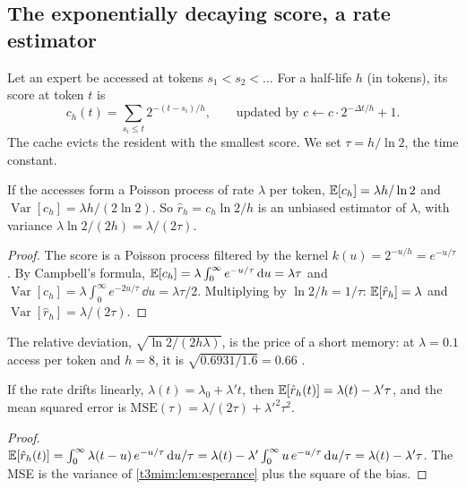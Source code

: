 \subsection{The exponentially decaying score, a rate estimator}\label{t3mim:sec:p1-score}

\begin{definition}\label{t3mim:def:score}
Let an expert be accessed at tokens $s_1 < s_2 < \dots$ For a half-life $h$ (in tokens), its score at token $t$ is
\begin{equation}\label{t3mim:eq:score}
c_h(t) = \sum_{s_i \le t} 2^{-(t - s_i)/h}, \qquad \text{updated by } c \leftarrow c \cdot 2^{-\Delta t / h} + 1 .
\end{equation}
The cache evicts the resident with the smallest score. We set $\tau = h / \ln 2$, the time constant.
\end{definition}

\begin{lemme}\label{t3mim:lem:esperance}
If the accesses form a Poisson process of rate $\lambda$ per token, $\mathbb{E}[c_h] = \lambda h / \ln 2$ and $\operatorname{Var}[c_h] = \lambda h / (2\ln 2)$. So $\hat r_h = c_h \ln 2 / h$ is an unbiased estimator of $\lambda$, with variance $\lambda \ln 2 / (2h) = \lambda/(2\tau)$.
\end{lemme}
\begin{proof}
The score is a Poisson process filtered by the kernel $k(u) = 2^{-u/h} = e^{-u/\tau}$. By Campbell's formula, $\mathbb{E}[c_h] = \lambda \int_0^\infty e^{-u/\tau}\,\mathrm{d} u = \lambda\tau$ and $\operatorname{Var}[c_h] = \lambda \int_0^\infty e^{-2u/\tau}\,\dd u = \lambda\tau/2$. Multiplying by $\ln 2/h = 1/\tau$: $\mathbb{E}[\hat r_h] = \lambda$ and $\operatorname{Var}[\hat r_h] = \lambda/(2\tau)$.
\end{proof}
The relative deviation, $\sqrt{\ln 2 / (2h\lambda)}$, is the price of a short memory: at $\lambda = 0.1$ access per token and $h = 8$, it is $\sqrt{0.6931/1.6} = 0.66$ \calc.

\begin{lemme}\label{t3mim:lem:retard}
If the rate drifts linearly, $\lambda(t) = \lambda_0 + \lambda' t$, then $\mathbb{E}[\hat r_h(t)] = \lambda(t) - \lambda'\tau$, and the mean squared error is $\mathrm{MSE}(\tau) = \lambda/(2\tau) + \lambda'^2\tau^2$.
\end{lemme}
\begin{proof}
$\mathbb{E}[\hat r_h(t)] = \int_0^\infty \lambda(t-u)\,e^{-u/\tau}\,\mathrm{d} u/\tau = \lambda(t) - \lambda' \int_0^\infty u\,e^{-u/\tau}\,\mathrm{d} u/\tau = \lambda(t) - \lambda'\tau$. The MSE is the variance of \cref{t3mim:lem:esperance} plus the square of the bias.
\end{proof}

